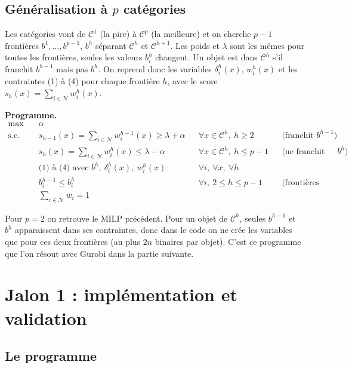 \documentclass[10pt,a4paper]{article}
\newcommand{\N}{\mathcal{N}}
\begin{document}
\subsection*{Généralisation à $p$ catégories}

Les catégories vont de $\mathcal{C}^1$ (la pire) à $\mathcal{C}^p$ (la meilleure) et on cherche $p-1$ frontières
$b^1,\dots,b^{p-1}$, $b^h$ séparant $\mathcal{C}^h$ et $\mathcal{C}^{h+1}$. Les poids et $\lambda$ sont les mêmes pour toutes les
frontières, seules les valeurs $b^h_i$ changent. Un objet est dans $\mathcal{C}^h$ s'il franchit $b^{h-1}$ mais pas $b^h$.
On reprend donc les variables $\delta^h_i(x)$, $w^h_i(x)$ et les contraintes (1) à (4) pour chaque frontière $h$,
avec le score $s_h(x)=\sum_{i\in\N} w^h_i(x)$.

\medskip
\textbf{Programme.}
\begin{align*}
\max\quad & \alpha \\[4pt]
\text{s.c.}\quad & s_{h-1}(x)=\textstyle\sum_{i\in\N} w^{h-1}_i(x) \geq \lambda + \alpha && \forall x\in\mathcal{C}^h,\ h\geq 2 && \text{(franchit $b^{h-1}$)}\\
& s_h(x)=\textstyle\sum_{i\in\N} w^h_i(x) \leq \lambda - \alpha && \forall x\in\mathcal{C}^h,\ h\leq p-1 && \text{(ne franchit pas $b^h$)}\\[4pt]
& \text{(1) à (4) avec } b^h,\ \delta^h_i(x),\ w^h_i(x) && \forall i,\ \forall x,\ \forall h \\[4pt]
& b^{h-1}_i \leq b^h_i && \forall i,\ 2\leq h\leq p-1 && \text{(frontières ordonnées)}\\
& \textstyle\sum_{i\in\N} w_i = 1
\end{align*}

\medskip
Pour $p=2$ on retrouve le MILP précédent. Pour un objet de $\mathcal{C}^h$, seules $b^{h-1}$ et $b^h$ apparaissent dans ses
contraintes, donc dans le code on ne crée les variables que pour ces deux frontières (au plus $2n$ binaires par objet).
C'est ce programme que l'on résout avec Gurobi dans la partie suivante.


\section*{Jalon 1 : implémentation et validation}

\subsection*{Le programme}
\end{document}
